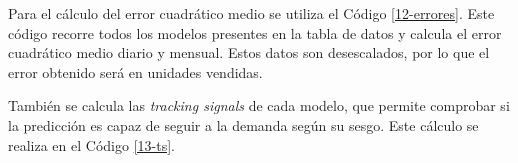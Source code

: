 

Para el cálculo del error cuadrático medio se utiliza el Código \ref*{12-errores}. Este código recorre todos los modelos presentes en la tabla de datos y calcula el error cuadrático medio diario y mensual. Estos datos son desescalados, por lo que el error obtenido será en unidades vendidas.



También se calcula las \textit{tracking signals} de cada modelo, que permite comprobar si la predicción es capaz de seguir a la demanda según su sesgo. Este cálculo se realiza en el Código \ref*{13-ts}.


